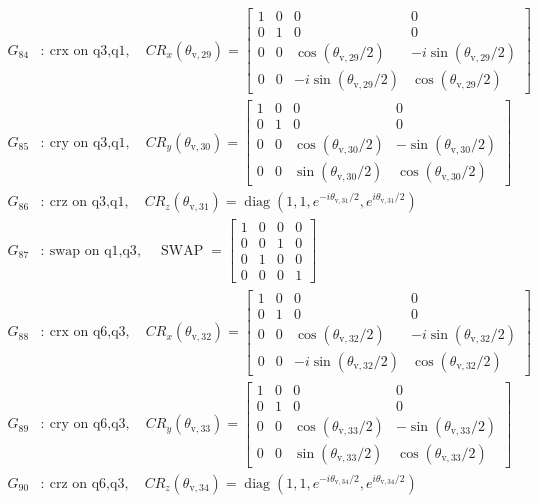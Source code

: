 \begin{align*}
G_{84}&:\ \text{crx on q3,q1},\quad CR_x(\theta_{\mathrm{v},29})=\begin{bmatrix}1&0&0&0\\0&1&0&0\\0&0&\cos(\theta_{\mathrm{v},29}/2)&-i\sin(\theta_{\mathrm{v},29}/2)\\0&0&-i\sin(\theta_{\mathrm{v},29}/2)&\cos(\theta_{\mathrm{v},29}/2)\end{bmatrix}\\
G_{85}&:\ \text{cry on q3,q1},\quad CR_y(\theta_{\mathrm{v},30})=\begin{bmatrix}1&0&0&0\\0&1&0&0\\0&0&\cos(\theta_{\mathrm{v},30}/2)&-\sin(\theta_{\mathrm{v},30}/2)\\0&0&\sin(\theta_{\mathrm{v},30}/2)&\cos(\theta_{\mathrm{v},30}/2)\end{bmatrix}\\
G_{86}&:\ \text{crz on q3,q1},\quad CR_z(\theta_{\mathrm{v},31})=\operatorname{diag}(1,1,e^{-i\theta_{\mathrm{v},31}/2},e^{i\theta_{\mathrm{v},31}/2})\\
G_{87}&:\ \text{swap on q1,q3},\quad \operatorname{SWAP}=\begin{bmatrix}1&0&0&0\\0&0&1&0\\0&1&0&0\\0&0&0&1\end{bmatrix}\\
G_{88}&:\ \text{crx on q6,q3},\quad CR_x(\theta_{\mathrm{v},32})=\begin{bmatrix}1&0&0&0\\0&1&0&0\\0&0&\cos(\theta_{\mathrm{v},32}/2)&-i\sin(\theta_{\mathrm{v},32}/2)\\0&0&-i\sin(\theta_{\mathrm{v},32}/2)&\cos(\theta_{\mathrm{v},32}/2)\end{bmatrix}\\
G_{89}&:\ \text{cry on q6,q3},\quad CR_y(\theta_{\mathrm{v},33})=\begin{bmatrix}1&0&0&0\\0&1&0&0\\0&0&\cos(\theta_{\mathrm{v},33}/2)&-\sin(\theta_{\mathrm{v},33}/2)\\0&0&\sin(\theta_{\mathrm{v},33}/2)&\cos(\theta_{\mathrm{v},33}/2)\end{bmatrix}\\
G_{90}&:\ \text{crz on q6,q3},\quad CR_z(\theta_{\mathrm{v},34})=\operatorname{diag}(1,1,e^{-i\theta_{\mathrm{v},34}/2},e^{i\theta_{\mathrm{v},34}/2})\\

\end{align*}
